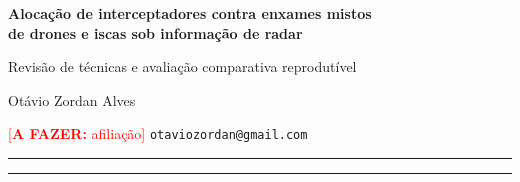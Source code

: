 \documentclass[11pt,a4paper]{article}
\newcommand{\todo}[1]{\textcolor{red}{[\textbf{A FAZER:} #1]}}
\begin{document}
\begin{center}
{\LARGE\bfseries Alocação de interceptadores contra enxames mistos\\[3pt]
de drones e iscas sob informação de radar\par}
\vspace{6pt}
{\large Revisão de técnicas e avaliação comparativa reprodutível\par}
\vspace{10pt}
{\large Otávio Zordan Alves\par}
\vspace{2pt}
{\small \todo{afiliação} \quad \texttt{otaviozordan@gmail.com}\par}
\end{center}
\vspace{6pt}
\hrule\vspace{8pt}
{\small}
\vspace{4pt}\hrule\vspace{14pt}
\thispagestyle{empty}











\small


\end{document}
